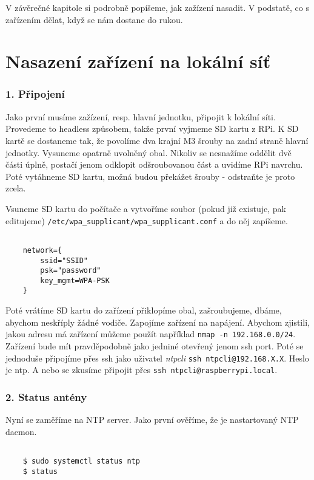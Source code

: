 V závěrečné kapitole si podrobně popíšeme, jak zažízení nasadit. V podstatě, co s
zařízením dělat, když se nám dostane do rukou.

\section{Nasazení zařízení na lokální síť}
\subsubsection{1. Připojení}
    Jako první musíme zažízení, resp. hlavní jednotku, připojit k lokální síti. Provedeme
    to headless způsobem, takže první vyjmeme SD kartu z RPi. K SD kartě se dostaneme tak,
    že povolíme dva krajní M3 šrouby na zadní straně hlavní jednotky. Vysuneme opatrně
    uvolněný obal. Nikoliv se nesnažíme oddělit dvě části úplně, postačí jenom odklopit
    odšroubovanou část a uvidíme RPi navrchu. Poté vytáhneme SD kartu, možná budou
    překážet šrouby - odstraňte je proto zcela.

    Vsuneme SD kartu do počítače a vytvoříme soubor (pokud již existuje, pak editujeme)
    \verb|/etc/wpa_supplicant/wpa_supplicant.conf| a do něj zapíšeme.

    \begin{lstlisting}

    network={
        ssid="SSID"
        psk="password"
        key_mgmt=WPA-PSK
    }

    \end{lstlisting}

    Poté vrátíme SD kartu do zařízení přiklopíme obal, zašroubujeme, dbáme, abychom
    neskříply žádné vodiče. Zapojíme zařízení na napájení. Abychom zjistili, jakou adresu
    má zařízení můžeme použít například \verb|nmap -n 192.168.0.0/24|. Zařízení bude mít
    pravděpodobně jako jedniné otevřený jenom ssh port. Poté se jednoduše připojíme přes
    ssh jako uživatel \textit{ntpcli} \verb|ssh ntpcli@192.168.X.X|. Heslo je ntp. A nebo se zkusíme
    připojit přes \verb|ssh ntpcli@raspberrypi.local|.

\newpage

\subsubsection{2. Status antény}

    Nyní se zaměříme na NTP server. Jako první ověříme, že je nastartovaný NTP daemon.

    \begin{lstlisting}

    $ sudo systemctl status ntp
    $ status

    \end{lstlisting}

